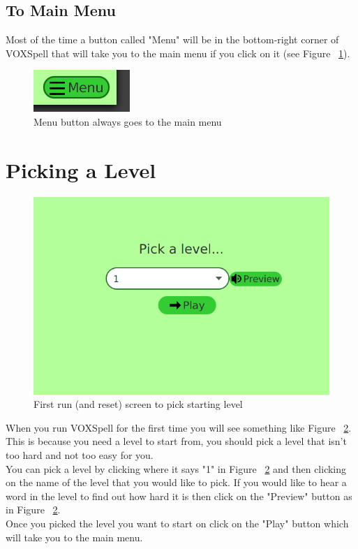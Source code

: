 \documentclass[12pt,a4paper,titlepage,onecolumn]{article}
\begin{document}
		\subsection{To Main Menu}
		Most of the time a button called "Menu" will be in the bottom-right corner of VOXSpell that will take you to the main menu if you click on it (see Figure ~\ref{fig:Menu}).
		\begin{figure}[h]
		\centering
		\includegraphics[width=0.2\linewidth]{Figures/Introduction/Menu}
		\caption[Menu Button]{Menu button always goes to the main menu}
		\label{fig:Menu}
		\end{figure}


	
	\section{Picking a Level}
	\begin{figure}[h]
	\centering
	\includegraphics[width=1\linewidth]{"Figures/Picking a Level/PickLevelGeneral"}
	\caption[PickLevel]{First run (and reset) screen to pick starting level}
	\label{fig:PickLevelGeneral}
	\end{figure}

	When you run VOXSpell for the first time you will see something like Figure ~\ref{fig:PickLevelGeneral}. This is because you need a level to start from, you should pick a level that isn't too hard and not too easy for you. \\
	You can pick a level by clicking where it says "1" in Figure ~\ref{fig:PickLevelGeneral} and then clicking on the name of the level that you would like to pick. If you would like to hear a word in the level to find out how hard it is then click on the "Preview" button as in Figure ~\ref{fig:PickLevelGeneral}.\\
	Once you picked the level you want to start on click on the "Play" button which will take you to the main menu.
	
\end{document}

